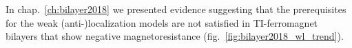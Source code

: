 In chap.~\ref{ch:bilayer2018} we presented evidence suggesting that the prerequisites for the weak (anti-)localization models are not satisfied in TI-ferromagnet bilayers that show negative magnetoresistance (fig.~\ref{fig:bilayer2018_wl_trend}).